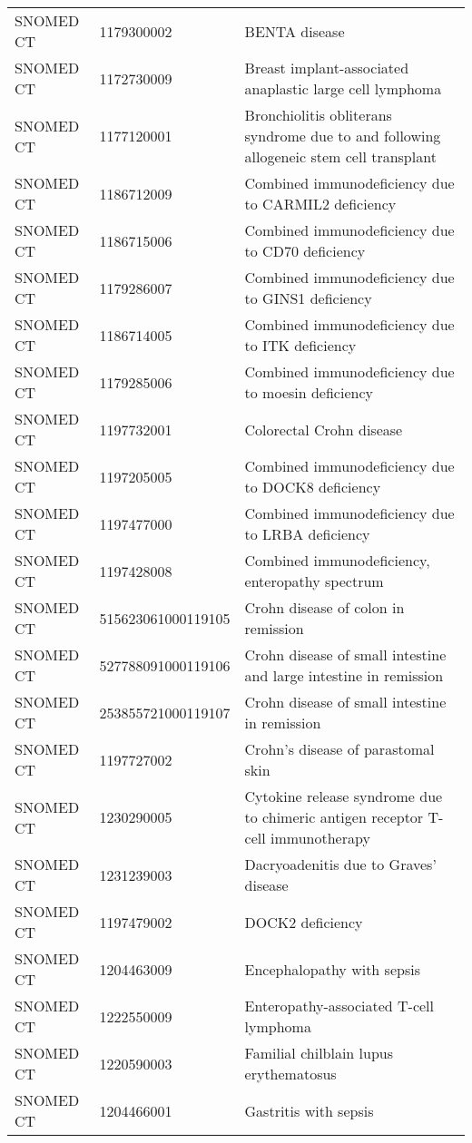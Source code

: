 \begin{longtable}{p{}p{}p{}}
  SNOMED CT & 1179300002 & BENTA disease \\ 
  SNOMED CT & 1172730009 & Breast implant-associated anaplastic large cell lymphoma \\ 
  SNOMED CT & 1177120001 & Bronchiolitis obliterans syndrome due to and following allogeneic stem cell transplant \\ 
  SNOMED CT & 1186712009 & Combined immunodeficiency due to CARMIL2 deficiency \\ 
  SNOMED CT & 1186715006 & Combined immunodeficiency due to CD70 deficiency \\ 
  SNOMED CT & 1179286007 & Combined immunodeficiency due to GINS1 deficiency \\ 
  SNOMED CT & 1186714005 & Combined immunodeficiency due to ITK deficiency \\ 
  SNOMED CT & 1179285006 & Combined immunodeficiency due to moesin deficiency \\ 
  SNOMED CT & 1197732001 & Colorectal Crohn disease \\ 
  SNOMED CT & 1197205005 & Combined immunodeficiency due to DOCK8 deficiency \\ 
  SNOMED CT & 1197477000 & Combined immunodeficiency due to LRBA deficiency \\ 
  SNOMED CT & 1197428008 & Combined immunodeficiency, enteropathy spectrum \\ 
  SNOMED CT & 515623061000119105 & Crohn disease of colon in remission \\ 
  SNOMED CT & 527788091000119106 & Crohn disease of small intestine and large intestine in remission \\ 
  SNOMED CT & 253855721000119107 & Crohn disease of small intestine in remission \\ 
  SNOMED CT & 1197727002 & Crohn's disease of parastomal skin \\ 
  SNOMED CT & 1230290005 & Cytokine release syndrome due to chimeric antigen receptor T-cell immunotherapy \\ 
  SNOMED CT & 1231239003 & Dacryoadenitis due to Graves' disease \\ 
  SNOMED CT & 1197479002 & DOCK2 deficiency \\ 
  SNOMED CT & 1204463009 & Encephalopathy with sepsis \\ 
  SNOMED CT & 1222550009 & Enteropathy-associated T-cell lymphoma \\ 
  SNOMED CT & 1220590003 & Familial chilblain lupus erythematosus \\ 
  SNOMED CT & 1204466001 & Gastritis with sepsis \\ 

\end{longtable}
